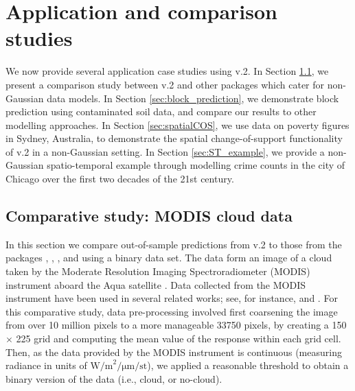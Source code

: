 \documentclass[article]{jss}
\begin{document}
\section{Application and comparison studies}\label{SEC:ApplicationStudy}


We now provide several application case studies using  v.2.
In Section \ref{sec:04-01:MODIS}, we present a comparison study between  v.2 and other packages which cater for non-Gaussian data models. 
In Section \ref{sec:block_prediction}, we demonstrate block prediction using contaminated soil data, and compare our results to other modelling approaches. 
In Section \ref{sec:spatialCOS}, we use data on poverty figures in Sydney, Australia, to demonstrate the spatial change-of-support functionality of  v.2 in a non-Gaussian setting.
In Section \ref{sec:ST_example}, we provide a non-Gaussian spatio-temporal example through modelling crime counts in the city of Chicago over the first two decades of the 21st century.



\subsection{Comparative study: MODIS cloud data}\label{sec:04-01:MODIS}


In this section we compare out-of-sample predictions from  v.2 to those from the  packages  \citep{Lindgren_2015_R-INLA},   \citep{Finley_2020_spNNGP},  \citep{Finley_2015_spBayes}, and  \citep{Wood_2017_GAM:R} using a binary data set. 
The data form an image of a cloud taken by the Moderate Resolution Imaging Spectroradiometer (MODIS) instrument aboard the Aqua satellite \citep{MODIS_satelitte}. 
Data collected from the MODIS instrument have been used in several related works; see, for instance, \cite{Sengupta_2016_MODIS} and  \cite{ZammitMangion_2021_Deep_compositional_spatial_model}.
For this comparative study, data pre-processing involved first coarsening the image from over 10 million pixels to a more manageable 33750 pixels, by creating a 150 $\times$ 225 grid and computing the mean value of the response within each grid cell. 
Then, as the data provided by the MODIS instrument is continuous (measuring radiance in units of $\text{W/m}^2/\si{\um}/\text{st}$), we applied a reasonable threshold to obtain a binary version of the data (i.e., cloud, or no-cloud).
\end{document}

